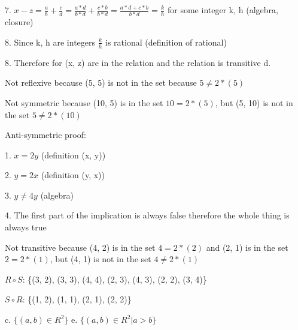 \documentclass[12pt]{article}
\newenvironment{problem}[2][Problem]{\begin{trivlist}
\item[\hskip \labelsep {\bfseries #1}\hskip \labelsep {\bfseries #2.}]}{\end{trivlist}}
\begin{document}
7. $x - z = \frac{a}{b} + \frac{c}{d} = \frac{a*d}{b*d} + \frac{c*b}{b*d} = \frac{a*d+c*b}{b*d} = \frac{k}{h}$ for some integer k, h (algebra, closure)

8. Since k, h are integers $\frac{k}{h}$ is rational (definition of rational)

8. Therefore for (x, z) are in the relation and the relation is transitive
\newline
d.

Not reflexive because (5, 5) is not in the set because $5 \neq 2*(5)$

Not symmetric because (10, 5) is in the set $10 = 2*(5)$, but (5, 10) is not in the set $5 \neq 2*(10)$

Anti-symmetric proof:

1. $x = 2y$ (definition (x, y))

2. $y = 2x$ (definition (y, x))

3. $y \neq 4y$ (algebra)

4. The first part of the implication is always false therefore the whole thing is always true

Not transitive because (4, 2) is in the set $4 = 2*(2)$ and (2, 1) is in the set $2 = 2*(1)$, but (4, 1) is not in the set $4 \neq 2*(1)$

\begin{problem}{9.1.32}
\end{problem}

$R \circ S$: \{(3, 2), (3, 3), (4, 4), (2, 3), (4, 3), (2, 2), (3, 4)\}

$S \circ R$: \{(1, 2), (1, 1), (2, 1), (2, 2)\}

\begin{problem}{9.1.36}
\end{problem}
c. $\{ (a, b) \in R^2\}$
\newline
e. $\{ (a, b) \in R^2 | a > b\}$
\end{document}
